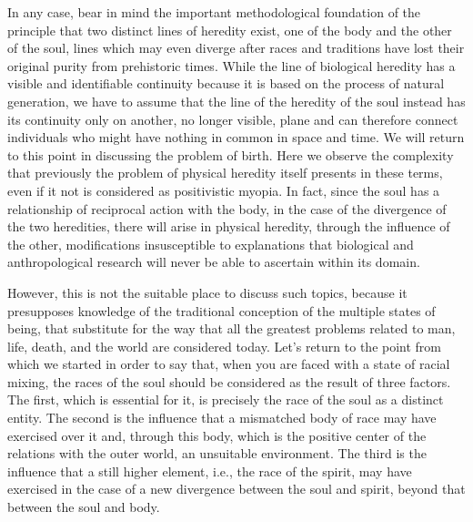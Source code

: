 In any case, bear in mind the important methodological foundation of the principle that two distinct lines of heredity exist, one of the body and the other of the soul, lines which may even diverge after races and traditions have lost their original purity from prehistoric times. While the line of biological heredity has a visible and identifiable continuity because it is based on the process of natural generation, we have to assume that the line of the heredity of the soul instead has its continuity only on another, no longer visible, plane and can therefore connect individuals who might have nothing in common in space and time. We will return to this point in discussing the problem of birth. Here we observe the complexity that previously the problem of physical heredity itself presents in these terms, even if it not is considered as positivistic myopia. In fact, since the soul has a relationship of reciprocal action with the body, in the case of the divergence of the two heredities, there will arise in physical heredity, through the influence of the other, modifications insusceptible to explanations that biological and anthropological research will never be able to ascertain within its domain.

However, this is not the suitable place to discuss such topics, because it presupposes knowledge of the traditional conception of the multiple states of being, that substitute for the way that all the greatest problems related to man, life, death, and the world are considered today. Let's return to the point from which we started in order to say that, when you are faced with a state of racial mixing, the races of the soul should be considered as the result of three factors. The first, which is essential for it, is precisely the race of the soul as a distinct entity. The second is the influence that a mismatched body of race may have exercised over it and, through this body, which is the positive center of the relations with the outer world, an unsuitable environment. The third is the influence that a still higher element, i.e., the race of the spirit, may have exercised in the case of a new divergence between the soul and spirit, beyond that between the soul and body.

